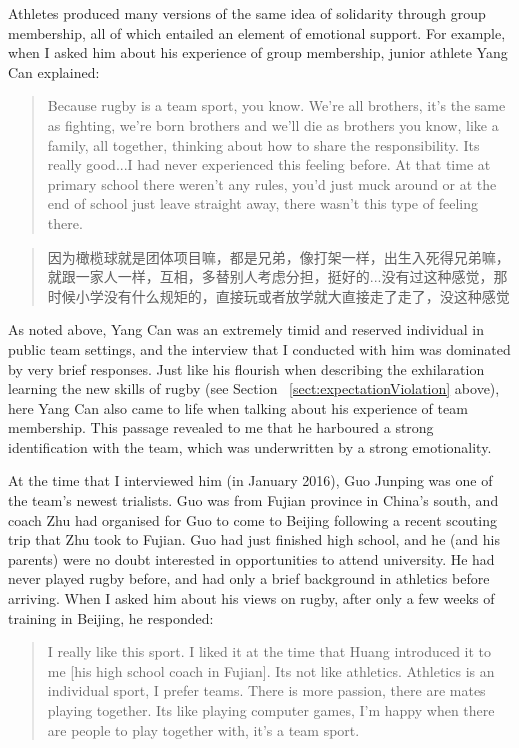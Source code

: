 \begin{CJK}{UTF8}{gbsn}
Athletes produced many versions of the same idea of solidarity through group membership, all of which entailed an element of emotional support. For example, when I asked him about his experience of group membership, junior athlete Yang Can explained:

    \begin{quote}
      Because rugby is a team sport, you know. We’re all brothers, it's the same as fighting, we’re born brothers and we’ll die as brothers you know, like a family, all together, thinking about how to share the responsibility. Its really good...I had never experienced this feeling before.  At that time at primary school there weren’t any rules, you’d just muck around or at the end of school just leave straight away, there wasn’t this type of feeling there.
    \end{quote}

    \begin{quote}
      因为橄榄球就是团体项目嘛，都是兄弟，像打架一样，出生入死得兄弟嘛，就跟一家人一样，互相，多替别人考虑分担，挺好的...没有过这种感觉，那时候小学没有什么规矩的，直接玩或者放学就大直接走了走了，没这种感觉
    \end{quote}

As noted above, Yang Can was an extremely timid and reserved individual in public team settings, and the interview that I conducted with him was dominated by very brief responses. Just like his flourish when describing the exhilaration learning the new skills of rugby (see Section ~\ref{sect:expectationViolation} above), here Yang Can also came to life when talking about his experience of team membership.  This passage revealed to me that he harboured a strong identification with the team, which was underwritten by a strong emotionality.

At the time that I interviewed him (in January 2016), Guo Junping was one of the team's newest trialists.  Guo was from Fujian province in China's south, and coach Zhu had organised for Guo to come to Beijing following a recent scouting trip that Zhu took to Fujian.  Guo had just finished high school, and he (and his parents) were no doubt interested in opportunities to attend university.  He had never played rugby before, and had only a brief background in athletics before arriving.  When I asked him about his views on rugby, after only a few weeks of training in Beijing, he responded:

  \begin{quote}
      I really like this sport.  I liked it at the time that Huang introduced it to me [his high school coach in Fujian]. Its not like athletics.  Athletics is an individual sport, I prefer teams.  There is more passion, there are mates playing together.  Its like playing computer games, I’m happy when there are people to play together with, it's a team sport.
  \end{quote}


\end{CJK}

